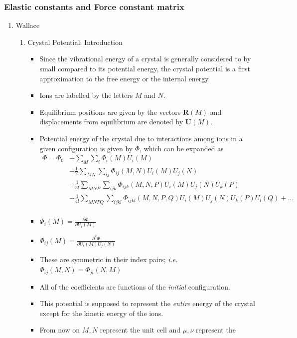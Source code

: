 \documentclass[11pt]{article}
\begin{document}
\subsubsection{Elastic constants and Force constant matrix}
\label{sec:orgb41ba2f}
\begin{enumerate}
\item Wallace
\label{sec:org9dcfa33}
\begin{enumerate}
\item Crystal Potential: Introduction
\label{sec:org5c14d6f}
\begin{itemize}
\item Since the vibrational energy of a crystal is generally considered to by
small compared to its potential energy, the crystal potential is a first
approximation to the free energy or the internal energy.
\item Ions are labelled by the letters \(M\) and \(N\).
\item Equilibrium positions are given by the vectors \(\mathbf{R}(M)\) and
displacements from equilibrium are denoted by \(\mathbf{U}(M)\).
\item Potential energy of the crystal due to interactions among ions in a
given configuration is given by \(\Phi\), which can be expanded as
\begin{align}
\Phi = \Phi_{0} &+ \sum_{M}\sum_{i} \Phi_{i}(M)U_{i}(M) \\ 
     &+ \frac{1}{2}\sum_{MN}\sum_{ij}\Phi_{ij}(M,N)U_i(M)U_j(N)\\ 
     &+ \frac{1}{3!} \sum_{MNP}\sum_{ijk}\Phi_{ijk}(M,N,P)U_{i}(M)U_{j}(N)U_{k}(P) \\
     &+ \frac{1}{4!} \sum_{MNPQ}\sum_{ijkl}\Phi_{ijkl}(M,N,P,Q)U_{i}(M)U_{j}(N)U_{k}(P)U_{l}(Q) + \dots \\
\end{align}
\item \(\Phi_{i}(M) = \frac{\partial \Phi}{\partial U_{i}(M)}\)
\item \(\Phi_{ij}(M) = \frac{\partial^{2} \Phi}{\partial U_{i}(M)U_{j}(N)}\)
\item These are symmetric in their index pairs; \emph{i.e.} \(\Phi_{ij}(M,N) = \Phi_{ji}(N,M)\)
\item All of the coefficients are functions of the \emph{initial} configuration.
\item This potential is supposed to represent the \emph{entire} energy of the crystal
except for the kinetic energy of the ions.
\item From now on \(M, N\) represent the unit cell and \(\mu, \nu\) represent the

\end{itemize}
\end{enumerate}
\end{enumerate}
\end{document}
